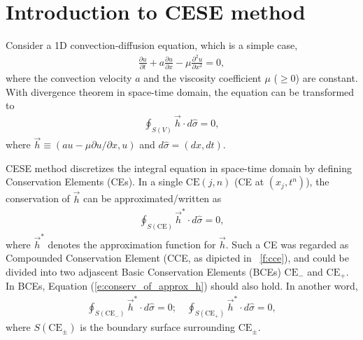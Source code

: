\documentclass[letterpaper,12pt,dvips]{article}
\numberwithin{equation}{section}
\begin{document}
\section{Introduction to CESE method}
\label{s:cese_intro}

Consider a 1D convection-diffusion equation, which is a simple case, 
\begin{align}
    \frac{\partial u}{\partial t} + a\frac{\partial u}{\partial x} 
  - \mu\frac{\partial^2u}{\partial x^2} = 0, \label{e:conv_diff_govern}
\end{align}
where the convection velocity $a$ and the viscosity coefficient $\mu$ 
($\ge0$) are constant.
With divergence theorem in space-time domain, the equation can be 
transformed to 
\begin{align}
  \oint_{S(V)}\vec{h}\cdot d\hat{\sigma}=0, \label{e:conservation}
\end{align}
where $\vec{h}\equiv(au-\mu\partial u/\partial x,u)$ and 
$d\hat{\sigma}=(dx, dt)$.

CESE method discretizes the integral equation in space-time domain by 
defining Conservation Elements (CEs).
In a single $\mathrm{CE}(j,n)$ (CE at $(x_j,t^n)$), the conservation of 
$\vec{h}$ can be approximated/written as 
\begin{align}
  \oint_{S(\mathrm{CE})}\vec{h}^*\cdot d\hat{\sigma} = 0, 
    \label{e:conserv_of_approx_h}
\end{align}
where $\vec{h}^*$ denotes the approximation function for $\vec{h}$.
Such a CE was regarded as Compounded Conservation Element (CCE, as 
dipicted in \figurename~\ref{f:cce}), and 
could be divided into two adjascent Basic Conservation Elements (BCEs) 
$\mathrm{CE}_-$ and $\mathrm{CE}_+$.
In BCEs, Equation (\ref{e:conserv_of_approx_h}) should also hold.
In another word, 
\begin{align*}
  \oint_{S(\mathrm{CE}_-)}\vec{h}^*\cdot d\hat{\sigma} = 0; \quad
  \oint_{S(\mathrm{CE}_+)}\vec{h}^*\cdot d\hat{\sigma} = 0, 
\end{align*}
where $S(\mathrm{CE}_{\pm})$ is the boundary surface surrounding 
$\mathrm{CE}_{\pm}$.
\end{document}
